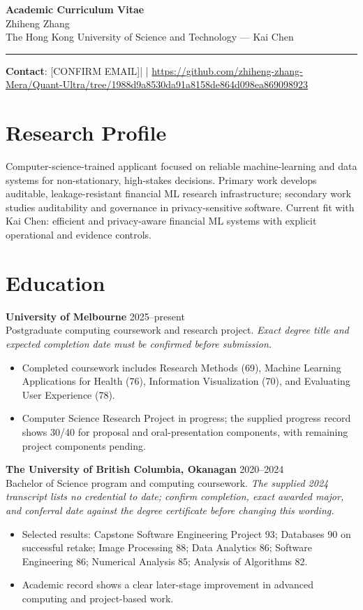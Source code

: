 \documentclass[11pt]{article}
\newcommand{\ApplicantName}{Zhiheng Zhang}
\newcommand{\ApplicantEmail}{[CONFIRM EMAIL]}
\newcommand{\ApplicantPhone}{[CONFIRM PHONE]}
\newcommand{\ApplicantGitHub}{\url{https://github.com/zhiheng-zhang-Mera/Quant-Ultra/tree/1988d9a8530da91a8158de864d098ea869098923}}
\begin{document}
\begin{center}
{\LARGE\bfseries Academic Curriculum Vitae}\\[0.25em]
{\large \ApplicantName}\\
The Hong Kong University of Science and Technology --- Kai Chen
\end{center}
\vspace{0.35em}\hrule\vspace{0.65em}

\textbf{Contact}: \ApplicantEmail\quad | \quad \ApplicantPhone\quad | \quad \ApplicantGitHub

\section*{Research Profile}
Computer-science-trained applicant focused on reliable machine-learning and data systems for non-stationary, high-stakes decisions. Primary work develops auditable, leakage-resistant financial ML research infrastructure; secondary work studies auditability and governance in privacy-sensitive software. Current fit with Kai Chen: efficient and privacy-aware financial ML systems with explicit operational and evidence controls.

\section*{Education}
\textbf{University of Melbourne} \hfill 2025--present\\
Postgraduate computing coursework and research project. \textit{Exact degree title and expected completion date must be confirmed before submission.}
\begin{itemize}
\item Completed coursework includes Research Methods (69), Machine Learning Applications for Health (76), Information Visualization (70), and Evaluating User Experience (78).
\item Computer Science Research Project in progress; the supplied progress record shows 30/40 for proposal and oral-presentation components, with remaining project components pending.
\end{itemize}

\textbf{The University of British Columbia, Okanagan} \hfill 2020--2024\\
Bachelor of Science program and computing coursework. \textit{The supplied 2024 transcript lists no credential to date; confirm completion, exact awarded major, and conferral date against the degree certificate before changing this wording.}
\begin{itemize}
\item Selected results: Capstone Software Engineering Project 93; Databases 90 on successful retake; Image Processing 88; Data Analytics 86; Software Engineering 86; Numerical Analysis 85; Analysis of Algorithms 82.
\item Academic record shows a clear later-stage improvement in advanced computing and project-based work.
\end{itemize}
\end{document}

